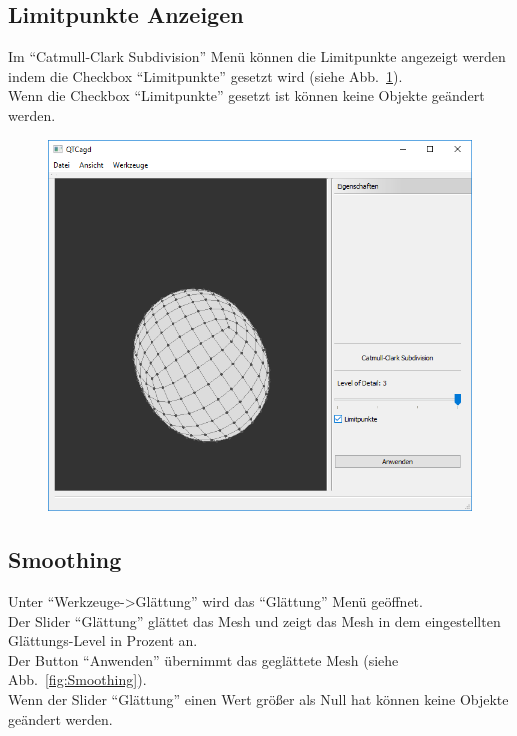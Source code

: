 \subsection{Limitpunkte Anzeigen}
Im "`Catmull-Clark Subdivision"' Menü können die Limitpunkte angezeigt werden indem die Checkbox "`Limitpunkte"' gesetzt wird (siehe Abb.~\ref{fig:Limitpunkte}).\\
Wenn die Checkbox "`Limitpunkte"' gesetzt ist können keine Objekte geändert werden.

\begin{figure}[H]
	\centering
	\includegraphics[scale=0.5]{content/pictures/9-Limitpunkte}
	\caption{}
	\label{fig:Limitpunkte}
\end{figure}

\subsection{Smoothing}
Unter "`Werkzeuge->Glättung"' wird das "`Glättung"' Menü geöffnet.\\
Der Slider "`Glättung"' glättet das Mesh und zeigt das Mesh in dem eingestellten Glättungs-Level in Prozent an.\\
Der Button "`Anwenden"' übernimmt das geglättete Mesh (siehe Abb.~\ref{fig:Smoothing}).\\
Wenn der Slider "`Glättung"' einen Wert grö\ss{}er als Null hat können keine Objekte geändert werden.

